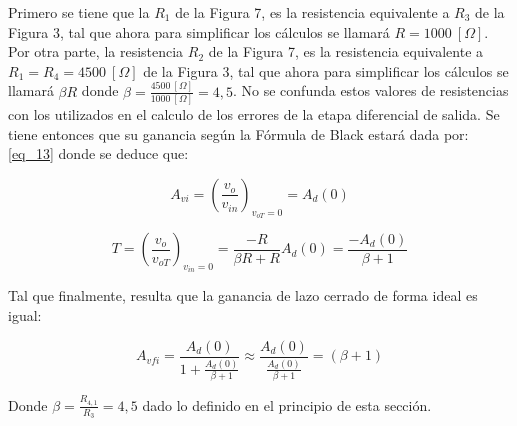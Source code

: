 \documentclass[12pt,a4paper]{article}
\begin{document}
Primero se tiene que la $R_{1}$ de la Figura 7, es la resistencia equivalente a $R_{3}$ de la Figura 3, tal que ahora para simplificar los cálculos se llamará $R= 1000 \ [\Omega]$. Por otra parte, la resistencia $R_{2}$ de la Figura 7, es la resistencia equivalente a $R_{1}=R_{4}=4500 \ [\Omega]$ de la Figura 3, tal que ahora para simplificar los cálculos se llamará $\beta R$ donde $\beta=\frac{4500 \ [\Omega]}{1000 \ [\Omega]} = 4,5$. No se confunda estos valores de resistencias con los utilizados en el calculo de los errores de la etapa diferencial de salida.
Se tiene entonces que su ganancia según la Fórmula de Black estará dada por: \ref{eq_13} donde se deduce que:

\begin{equation}
    \label{eq_26}
    A_{vi} = \left(\frac{v_{o}}{v_{in}}\right)_{v_{oT}=0} = A_{d}(0)
\end{equation}

\begin{equation}
    \label{eq_27}
    T = \left(\frac{v_{o}}{v_{oT}}\right)_{v_{in}=0} = \frac{-R }{\beta R+ R}A_{d}(0) = \frac{-A_{d}(0)}{\beta+1}
\end{equation}

Tal que finalmente, resulta que la ganancia de lazo cerrado de forma ideal es igual:

\begin{equation}
    \label{eq_28}
    A_{vfi} = \frac{ A_{d}(0)}{1 + \frac{A_{d}(0)}{\beta+1}} \approx \frac{ A_{d}(0)}{\frac{A_{d}(0)}{\beta+1}}=(\beta+1)
\end{equation}

Donde $\beta = \frac{R_{4,1}}{R_{3}}=4,5$ dado lo definido en el principio de esta sección.
\end{document}

